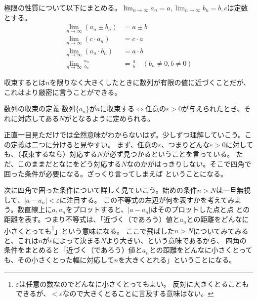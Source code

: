\documentclass[a4j,dvipdfmx]{jsarticle}
\begin{document}
                極限の性質について以下にまとめる。$\displaystyle\lim_{n\to\infty}a_n=a,\lim_{n\to\infty}b_n=b,cは定数$とする。
                \begin{align}
                    \lim_{n\to\infty}(a_n\pm b_n)&=a\pm b\\
                    \lim_{n\to\infty}(c\cdot a_n)&=c\cdot a\\
                    \lim_{n\to\infty}(a_n\cdot b_n)&=a\cdot b\\
                    \lim_{n\to\infty}\frac{a_n}{b_n}&=\frac{a}{b}\quad(b_n\neq 0,b\neq 0)
                \end{align}

                収束するとは$n$を限りなく大きくしたときに数列が有限の値に近づくことだが、これはより厳密に言うことができる。
                \begin{itembox}{数列の収束の定義}
                    数列$\{a_n\}$が$a$に収束する$\Leftrightarrow $任意の$\varepsilon>0$が与えられたとき、それに対応してある$N$がとなるように定められる。
                \end{itembox}
                正直一目見ただけでは全然意味がわからないはず。少しずつ理解していこう。この定義は二つに分けると見やすい。
                まず、任意の$\varepsilon$、つまりどんな$\varepsilon>0$に対しても、（収束するなら）対応する$N$が必ず見つかるということを言っている。
                ただ、このままだとなにをどう対応する$N$なのかがはっきりしない。そこで四角で囲った条件が必要になる。ざっくり言ってしまえば
                ということになる。

                次に四角で囲った条件について詳しく見ていこう。始めの条件$n>N$は一旦無視して、$|a-a_n|<\varepsilon$に注目する。
                この不等式の左辺が何を表すかを考えてみよう。数直線上に$a,a_n$をプロットすると、$|a-a_n|$はそのプロットした点と点
                との距離を表す。つまり不等式は、「近づく（であろう）値と$a_n$との距離をどんなに小さくとっても\footnote{$\varepsilon$は任意の数なのでどんなに小さくとってもよい。
                反対に大きくとることもできるが、$<\varepsilon$なので大きくとることに言及する意味はない。}」という意味になる。
                ここで飛ばした$n>N$についてみてみると、これは$n$が$\varepsilon$によって決まる$N$より大きい、という意味であるから、
                四角の条件をまとめると「近づく（であろう）値と$a_n$との距離をどんなに小さくとっても、その小さくとった幅に対応して$n$を大きくとれる」ということになる。\\
\end{document}
